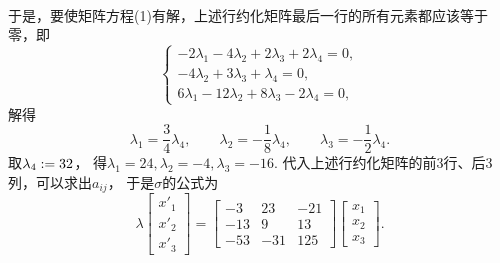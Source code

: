 \begin{example}
\begin{solution}
\begin{align*}
\end{align*}
于是，要使矩阵方程(1)有解，上述行约化矩阵最后一行的所有元素都应该等于零，即\begin{equation*}
	\begin{cases}
		-2 \lambda_1 - 4 \lambda_2 + 2 \lambda_3 + 2 \lambda_4
		= 0, \\
		-4 \lambda_2 + 3 \lambda_3 + \lambda_4
		= 0, \\
		6 \lambda_1 - 12 \lambda_2 + 8 \lambda_3 - 2 \lambda_4
		= 0,
	\end{cases}
\end{equation*}
解得\begin{equation*}
	\lambda_1
	= \frac34 \lambda_4,
	\qquad
	\lambda_2
	= -\frac18 \lambda_4,
	\qquad
	\lambda_3
	= -\frac12 \lambda_4.
\end{equation*}
取\(\lambda_4 := 32\)，
得\(
	\lambda_1 = 24,
	\lambda_2 = -4,
	\lambda_3 = -16
\).
代入上述行约化矩阵的前3行、后3列，可以求出\(a_{ij}\)，
于是\(\sigma\)的公式为\begin{equation*}
	\lambda
	\begin{bmatrix}
		x'_1 \\ x'_2 \\ x'_3
	\end{bmatrix}
	= \begin{bmatrix}
		-3 & 23 & -21 \\
		-13 & 9 & 13 \\
		-53 & -31 & 125
	\end{bmatrix}
	\begin{bmatrix}
		x_1 \\ x_2 \\ x_3
	\end{bmatrix}.
\end{equation*}
\end{solution}
\end{example}

